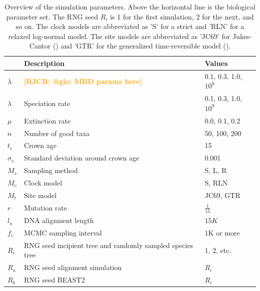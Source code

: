 \documentclass{article}
\newcommand*\richel[1]{\textcolor{orange}{\textbf{[RJCB: #1]}}}
\begin{document}
\begin{table}
  \centering 
  \begin{tabular}{p{} p{} p{}}
    \hline
                          & Description & Values \\
    \hline
    \hline
    $\lambda$             & \richel{@gio: MBD params here} & 0.1, 0.3, 1.0, $10^9$ \\
    $\lambda$             & Speciation rate & 0.1, 0.3, 1.0, $10^9$ \\
    $\mu$                 & Extinction rate & 0.0, 0.1, 0.2 \\
    \hline
    $n$                   & Number of good taxa & 50, 100, 200 \\
    $t_c$                 & Crown age & 15 \\
    $\sigma_c$            & Standard deviation around crown age & 0.001 \\
    $M_s$                 & Sampling method & S, L, R \\
    $M_c$                 & Clock model & S, RLN \\
    $M_t$                 & Site model & JC69, GTR \\
    $r$                   & Mutation rate & $\frac{1}{15}$ \\
    $l_a$                 & DNA alignment length & $15K$ \\
    $f_i$                 & MCMC sampling interval & 1K or more \\
    $R_i$                 & RNG seed incipient tree and randomly sampled species tree & 1, 2, etc. \\
    $R_a$                 & RNG seed alignment simulation & $R_i$ \\
    $R_b$                 & RNG seed BEAST2 & $R_i$ \\
    \hline
  \end{tabular}
  \caption{
    Overview of the simulation parameters. Above the horizontal line is 
    the biological parameter set. 
    The RNG seed $R_i$ is 1 for the first simulation, 2 for the next,
    and so on.  
    The clock models are abbreviated as 'S' for a strict and 'RLN' for a relaxed log-normal model.
    The site models are abbreviated as 'JC69' for Jukes-Cantor (\cite{jc69}) and 'GTR' for the generalized 
    time-reversible model (\cite{gtr}).
  }
  \label{table:parameters}
\end{table}
\end{document}
